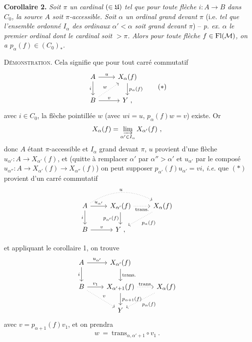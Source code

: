 
\textbf{Corollaire 2.} \textit{Soit $\pi$ un cardinal} $(\in \mathfrak{U})$ \textit{tel que pour toute flèche $i : A \longrightarrow B$ dans $C_0$, la source $A$ soit $\pi$-accessible. Soit $\alpha$ un ordinal grand devant $\pi$} (i.e. \textit{tel que l'ensemble ordonné $I_\alpha$ des ordinaux $\alpha' < \alpha$ soit grand devant $\pi$}) -- \textit{p. ex. $\alpha$ le premier ordinal dont le cardinal soit $> \pi$. Alors pour toute flèche $f \in \mathrm{Fl}(\mathcal{M})$, on a $p_\alpha(f) \in (C_0)_*$.}

\textsc{Démonstration}. Cela signifie que pour tout carré commutatif
\[
\begin{tikzcd}
A \arrow[r, "u"] \arrow[d, "i"'] & X_\alpha(f) \arrow[d, "p_\alpha(f)"] \\
B \arrow[r, "v"] \arrow[ur, dotted, "w"] & Y \ ,
\end{tikzcd}
\tag*{$(*)$}
\]
avec $i \in C_0$, la flèche pointillée $w$ (avec $wi = u$, $p_\alpha(f)w = v$) existe. Or
\[
X_\alpha(f) = \varinjlim_{\alpha' \in I_\alpha} X_{\alpha'}(f) \ ,
\]
donc $A$ étant $\pi$-accessible et $I_\alpha$ grand devant $\pi$, $u$ provient d'une flèche $u_{\alpha'} : A \longrightarrow X_{\alpha'}(f)$, et (quitte à remplacer $\alpha'$ par $\alpha'' > \alpha'$ et $u_{\alpha'}$ par le composé $u_{\alpha''} : A \longrightarrow X_{\alpha'}(f) \longrightarrow X_{\alpha''}(f)$) on peut supposer $p_{\alpha'}(f)u_{\alpha'} = vi$, \textit{i.e.} que $(*)$ provient d'un carré commutatif
\[
\begin{tikzcd}
A \arrow[r, "u_{\alpha'}"] \arrow[d, "i"'] \arrow[rr, dotted, bend left=30, "u"] & X_{\alpha'}(f) \arrow[r, dotted, "\text{trans.}"'] \arrow[d, "p_{\alpha'}(f)"'] & X_\alpha(f) \arrow[dl, dotted, "p_\alpha(f)"] \\
B \arrow[r, "v"] & Y \ , &
\end{tikzcd}
\]

et appliquant le corollaire 1, on trouve
\[
\begin{tikzcd}
A \arrow[r, "u_{\alpha'}"] \arrow[d, "i"'] & X_{\alpha'}(f) \arrow[d, "\text{trans.}"] & \\
B \arrow[r, "v_1"] \arrow[dr, dotted, "v"] & X_{\alpha'+1}(f) \arrow[r, dotted, "\text{trans.}"] \arrow[d, "p_{\alpha+1}(f)"] & X_\alpha(f) \arrow[dl, dotted, "p_\alpha(f)"] \\ %
 & Y &
\end{tikzcd}
\]
avec $v = p_{\alpha+1}(f)v_1$, et on prendra %
\[
w \ = \ \mathrm{trans}_{\alpha,\alpha'+1} \circ v_1 \ .
\]

